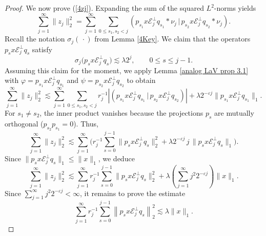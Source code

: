 \documentclass[12pt]{amsart}
\theoremstyle{remark}
\theoremstyle{definition}
\numberwithin{equation}{section}
\begin{document}
\begin{proof}
We now prove (\ref{4zj}). 
Expanding the sum of the squared $L^2$-norms yields
\[
\sum_{j=1}^{\infty}\|z_j\|_2^2 = \sum_{j=1}^{\infty} \sum_{0\le s_1,s_2<j} 
\left(p_{s_1} x\mathcal{E}_j^\perp q_{s_1}\ast\nu_j\,
\vert\,p_{s_2}x\mathcal{E}_j^\perp q_{s_2}\ast\nu_j \right).
\]
Recall the notation $\sigma_j(\,\cdotp)$ from Lemma \ref{4Key}.
We claim that the operators 
$p_s x \mathcal{E}_j^\perp q_s$ satisfy
\begin{equation}\label{4Claim}
\sigma_j\bigl(p_s x\mathcal{E}_j^\perp q_s\bigr)\lesssim \lambda 2^j,
\qquad 0\leq s\leq j-1.
\end{equation}
Assuming this claim for the moment, we apply 
Lemma \ref{analog LaV prop 3.1} with
$\varphi = p_{s_1} x\mathcal{E}_j^\perp q_{s_1}$ and 
$\psi= p_{s_2} x\mathcal{E}_j^\perp q_{s_2}$ to obtain
\[
\sum_{j=1}^{\infty}\|z_j\|_2^2 \lesssim \sum_{j=1}^{\infty} 
\sum_{0\le s_1,s_2<j} r_j^{-1} \left| \left( p_{s_1}
x\mathcal{E}_j^\perp q_{s_1}\,\vert\, p_{s_2}x\mathcal{E}_j^\perp q_{s_2} 
\right) \right| + 
\lambda 2^{-\varepsilon j} \|p_{s_1}x\mathcal{E}_j^\perp q_{s_1}\|_1.
\]
For $s_1\neq s_2$, the inner product vanishes because the 
projections $p_s$ are mutually orthogonal ($p_{s_2}p_{s_1}=0$). 
Thus,
\[
\sum_{j=1}^{\infty}\|z_j\|_2^2 \lesssim \sum_{j=1}^{\infty} 
\biggl( r_j^{-1} \sum_{s=0}^{j-1} \|p_s x
\mathcal{E}_j^\perp q_s\|_2^2 + 
\lambda 2^{-\varepsilon j}\,j\, \|p_s x\mathcal{E}_j^\perp q_s\|_1 \biggr).
\]
Since $\|p_s x\mathcal{E}_j^\perp q_s\|_1 \le \|x\|_1$, we 
deduce
\[
\sum_{j=1}^{\infty}\|z_j\|_2^2 \lesssim \sum_{j=1}^{\infty} 
r_j^{-1} \sum_{s=0}^{j-1} \|p_s x\mathcal{E}_j^\perp q_s\|_2^2 
+ \lambda \left( \sum_{j=1}^{\infty} 
j^2 2^{-\varepsilon j} \right) \|x\|_1.
\]
Since $\sum_{j=1}^{\infty} j^{2} 2^{-\varepsilon j}<\infty$, 
it remains to prove the estimate
\begin{equation}\label{star}
\sum_{j=1}^{\infty} r_j^{-1} \sum_{s=0}^{j-1} 
\left\|p_s x\mathcal{E}_j^\perp q_s\right\|_2^2 
\lesssim \lambda\|x\|_1.
\end{equation}





\end{proof}
\end{document}
